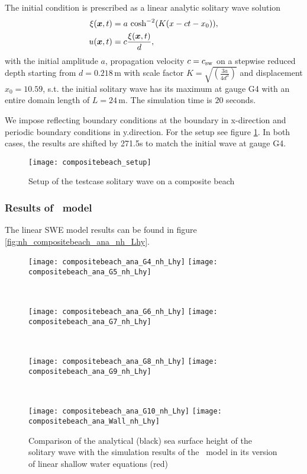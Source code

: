 The initial condition is prescribed as a linear analytic solitary wave solution
\begin{align}
\xi(\boldsymbol{x},t)&=a \ \text{cosh}^{-2}(K(x-ct-x_0)), \\
u(\boldsymbol{x},t)&=c\frac{\xi(\boldsymbol{x},t)}{d},
\end{align}
with the initial amplitude $a$, propagation velocity $c=c_{\text{sw}}$ on a stepwise reduced depth starting from $d=0.218 \, \text{m}$ with scale factor $K=\sqrt{\left(\frac{3a}{4d^3}\right)}$ and displacement $x_0=10.59$, s.t. the initial solitary wave has its maximum at gauge G4 with an entire domain length of $L=24 \, \text{m}$. The simulation time is $20$ seconds. 

We impose reflecting boundary conditions at the boundary in x-direction and periodic boundary conditions in y.direction. For the setup see figure \ref{fig:compositebeach_setup}. In both cases, the results are shifted by 271.5s to match the initial wave at gauge G4.

\begin{figure}[htbp]
\texttt{[image: compositebeach\_setup]}
\caption{Setup of the testcase solitary wave on a composite beach}
\label{fig:compositebeach_setup}
\end{figure}

\subsubsection{Results of \nh\ model}
The linear SWE model results can be found in figure \eqref{fig:nh_compositebeach_ana_nh_Lhy}.

\begin{figure}[htbp]
\begin{minipage}{\textwidth}
\texttt{[image: compositebeach\_ana\_G4\_nh\_Lhy]}
\texttt{[image: compositebeach\_ana\_G5\_nh\_Lhy]}
\end{minipage} \\
\begin{minipage}{\textwidth}
\texttt{[image: compositebeach\_ana\_G6\_nh\_Lhy]}
\texttt{[image: compositebeach\_ana\_G7\_nh\_Lhy]}
\end{minipage} \\
\begin{minipage}{\textwidth}
\texttt{[image: compositebeach\_ana\_G8\_nh\_Lhy]}
\texttt{[image: compositebeach\_ana\_G9\_nh\_Lhy]}
\end{minipage} \\
\begin{minipage}{\textwidth}
\texttt{[image: compositebeach\_ana\_G10\_nh\_Lhy]}
\texttt{[image: compositebeach\_ana\_Wall\_nh\_Lhy]}
\end{minipage}
\caption{Comparison of the analytical (black) sea surface height of the
solitary wave with the simulation results of the \nh\ model in its version of linear shallow water equations (red)}
\label{fig:nh_compositebeach_ana_nh_Lhy}
\end{figure}
